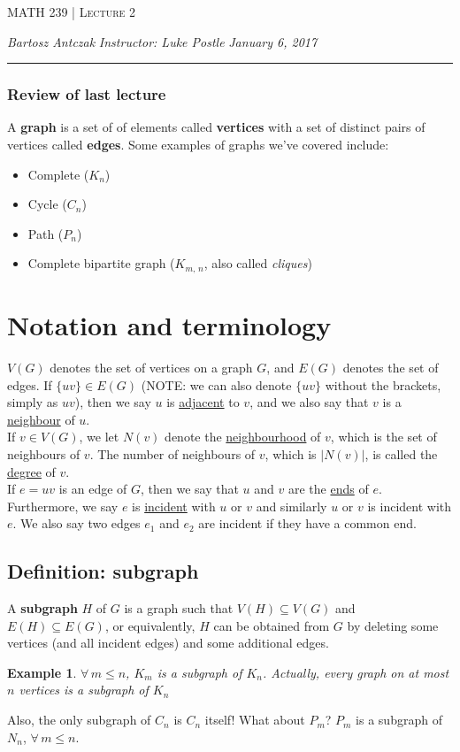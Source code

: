 \documentclass{report}
\newcommand{\lectureNum}{2}
\newcommand{\curDate}{January 6, 2017}
\newcommand{\course}{MATH 239}
\newcommand{\instructor}{Luke Postle}
\newtheorem{ex}{Example}[section]
\begin{document}
\begin{center}
\begin{Large}
\textsc{\course{} | Lecture \lectureNum{}}
\end{Large}
\end{center} 
\noindent \textit{Bartosz Antczak} \hfill
\textit{Instructor: \instructor{}} \hfill
\textit{\curDate{}}
\rule{\textwidth}{0.4pt}

\subsubsection{Review of last lecture}
A \textbf{graph} is a set of of elements called \textbf{vertices} with a set of distinct pairs of vertices called \textbf{edges}. Some examples of graphs we've covered include:
\begin{itemize}
\item Complete ($K_n$)
\item Cycle ($C_n$)
\item Path ($P_n$)
\item Complete bipartite graph ($K_{m,\,n}$, also called \textit{cliques})
\end{itemize}

\section{Notation and terminology}
$V(G)$ denotes the set of vertices on a graph $G$, and $E(G)$ denotes the set of edges. If $\{uv\} \in E(G)$ (NOTE: we can also denote $\{uv\}$ without the brackets, simply as $uv$), then we say $u$ is \underline{adjacent} to $v$, and we also say that $v$ is a \underline{neighbour} of $u$.\\
If $v \in V(G)$, we let $N(v)$ denote the \underline{neighbourhood} of $v$, which is the set of neighbours of $v$. The number of neighbours of $v$, which is $\vert N(v) \vert$, is called the \underline{degree} of $v$.\\
If $e = uv$ is an edge of $G$, then we say that $u$ and $v$ are the \underline{ends} of $e$. Furthermore, we say $e$ is \underline{incident} with $u$ or $v$ and similarly $u$ or $v$ is incident with $e$. We also say two edges $e_1$ and $e_2$ are incident if they have a common end.

\subsection{Definition: subgraph}
A \textbf{subgraph} $H$ of $G$ is a graph such that $V(H) \subseteq V(G)$ and $E(H) \subseteq E(G)$, or equivalently, $H$ can be obtained from $G$ by deleting some vertices (and all incident edges) and some additional edges.
\begin{ex}
$\forall \, m \leq n$, $K_m$ is a subgraph of $K_n$. Actually, every graph on at most $n$ vertices is a subgraph of $K_n$
\end{ex}
\noindent Also, the only subgraph of $C_n$ is $C_n$ itself! What about $P_m$? $P_m$ is a subgraph of $N_n$, $\forall \, m \leq n$.
\end{document}
